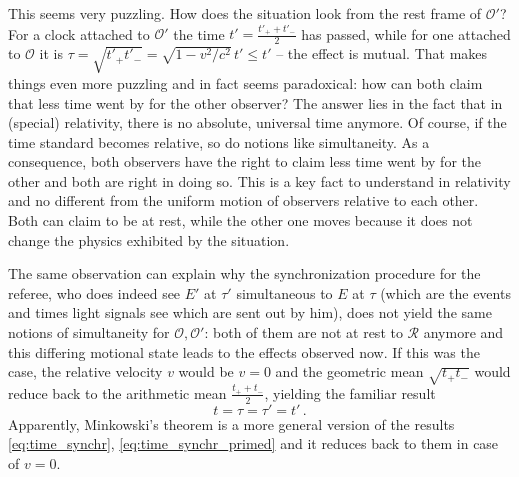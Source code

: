 


This seems very puzzling. How does the situation look from the rest frame of $\mathcal{O}'$? For a clock attached to $\mathcal{O}'$ the time $t' = \frac{t'_+ + t'_-}{2}$ has passed, while for one attached to $\mathcal{O}$ it is $\tau = \sqrt{t'_+ t'_-} = \sqrt{1 - v^2 / c^2} \, t' \leq t'$ -- the effect is mutual. That makes things even more puzzling and in fact seems paradoxical: how can both claim that less time went by for the other observer? The answer lies in the fact that in (special) relativity, there is no absolute, universal time anymore. Of course, if the time standard becomes relative, so do notions like simultaneity. As a consequence, both observers have the right to claim less time went by for the other and both are right in doing so. This is a key fact to understand in relativity and no different from the uniform motion of observers relative to each other. Both can claim to be at rest, while the other one moves because it does not change the physics exhibited by the situation.


The same observation can explain why the synchronization procedure for the referee, who does indeed see $E'$ at $\tau'$ simultaneous to $E$ at $\tau$ (which are the events and times light signals see which are sent out by him), does not yield the same notions of simultaneity for $\mathcal{O}, \mathcal{O}'$: both of them are not at rest to $\mathcal{R}$ anymore and this differing motional state leads to the effects observed now. If this was the case, the relative velocity $v$ would be $v = 0$ and the geometric mean $\sqrt{t_+ t_-}$ would reduce back to the arithmetic mean $\frac{t_+ + t_-}{2}$, yielding the familiar result
\begin{equation}
	t = \tau = \tau' = t' \, .
\end{equation}
Apparently, Minkowski's theorem is a more general version of the results \eqref{eq:time_synchr}, \eqref{eq:time_synchr_primed} and it reduces back to them in case of $v = 0$.



